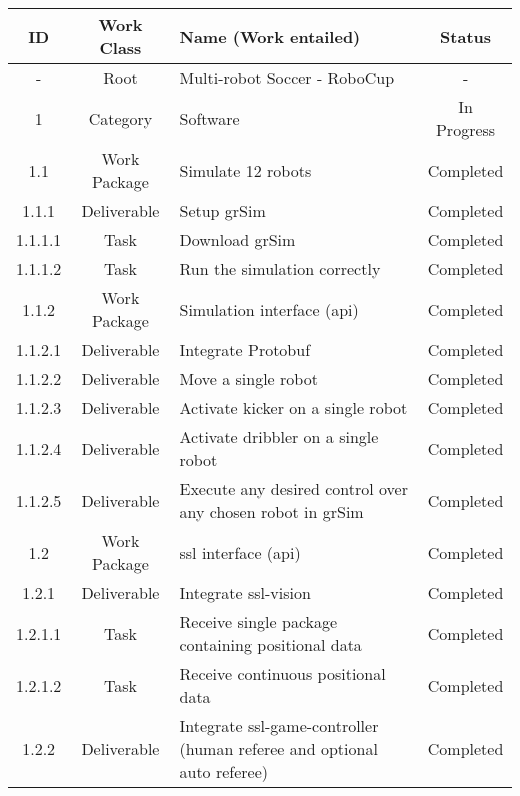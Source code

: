 \onecolumn
\begin{longtable}{|c|c|m{}|c|} \hline
    \centering
    \textbf{ID} & \textbf{Work Class} & \textbf{Name (Work entailed)} & \textbf{Status} \\ \hline
    \rowcolor{na} - & Root & Multi-robot Soccer - RoboCup & - \\ \hline
    \rowcolor{p} 1 & Category & Software & In Progress \\ \hline
    \rowcolor{d} 1.1 & Work Package & Simulate 12 robots & Completed \\ \hline
    \rowcolor{d} 1.1.1 & Deliverable & Setup grSim & Completed \\ \hline
    \rowcolor{d} 1.1.1.1 & Task & Download grSim & Completed \\ \hline
    \rowcolor{d} 1.1.1.2 & Task & Run the simulation correctly & Completed \\ \hline
    \rowcolor{d} 1.1.2 & Work Package & Simulation interface (\acs{api}) & Completed \\ \hline
    \rowcolor{d} 1.1.2.1 & Deliverable & Integrate Protobuf & Completed \\ \hline
    \rowcolor{d} 1.1.2.2 & Deliverable & Move a single robot & Completed \\ \hline
    \rowcolor{d} 1.1.2.3 & Deliverable & Activate kicker on a single robot & Completed \\ \hline
    \rowcolor{d} 1.1.2.4 & Deliverable & Activate dribbler on a single robot & Completed \\ \hline
    \rowcolor{d} 1.1.2.5 & Deliverable & Execute any desired control over any chosen robot in grSim & Completed \\ \hline
    \rowcolor{d} 1.2 & Work Package & \acs{ssl} interface (\acs{api}) & Completed \\ \hline
    \rowcolor{d} 1.2.1 & Deliverable & Integrate ssl-vision & Completed \\ \hline
    \rowcolor{d} 1.2.1.1 & Task & Receive single package containing positional data & Completed \\ \hline
    \rowcolor{d} 1.2.1.2 & Task & Receive continuous positional data & Completed \\ \hline
    \rowcolor{d} 1.2.2 & Deliverable & Integrate ssl-game-controller (human referee and optional auto referee) & Completed \\ \hline

\end{longtable}
